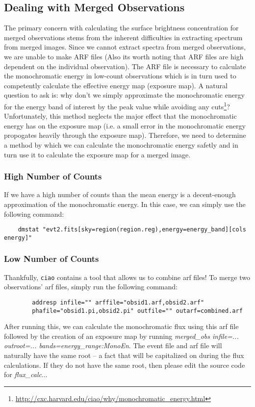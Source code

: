\documentclass[11pt,letterpaper]{article}
\begin{document}
\subsection{Dealing with Merged Observations}
The primary concern with calculating the surface brightness concentration for merged observations stems from the inherent difficulties in extracting spectrum from merged images. Since we cannot extract spectra from merged observations, we are unable to make ARF files (Also its worth noting that ARF files are high dependent on the individual observation). The ARF file is necessary to calculate the monochromatic energy in low-count observations which is in turn used to competently calculate the effective energy map (exposure map). A natural question to ask is: why don't we simply approximate the monochromatic energy for the energy band of interest by the peak value while avoiding any cuts\footnote{\href{http://cxc.harvard.edu/ciao/why/monochromatic_energy.html}{http://cxc.harvard.edu/ciao/why/monochromatic\_energy.html}}? Unfortunately, this method neglects the major effect that the monochromatic energy has on the exposure map (i.e. a small error in the monochromatic energy propogates heavily through the exposure map). Therefore, we need to determine a method by which we can calculate the monochromatic energy safetly and in turn use it to calculate the exposure map for a merged image.

\subsubsection{High Number of Counts}
If we have a high number of counts than the mean energy is a decent-enough approximation of the monochromatic energy. In this case, we can simply use the following command:
\begin{lstlisting}
	dmstat "evt2.fits[sky=region(region.reg),energy=energy_band][cols energy]"
\end{lstlisting}

\subsubsection{Low Number of Counts}
	Thankfully, \texttt{ciao} contains a tool that allows us to combine arf files! To merge two observations' arf files, simply run the following command:
	\begin{lstlisting}
		addresp infile="" arffile="obsid1.arf,obsid2.arf"
		phafile="obsid1.pi,obsid2.pi" outfile="" outarf=combined.arf
	\end{lstlisting}
After running this, we can calculate the monochromatic flux using this arf file followed by the creation of an exposure map by running \textit{merged\_obs infile=... outroot=... bands=energy\_range:MonoEn}. The event file and arf file will naturally have the same root -- a fact that will be capitalized on during the flux calculations. If they do not have the same root, then please edit the source code for \textit{flux\_calc}...

\newpage


\end{document}
